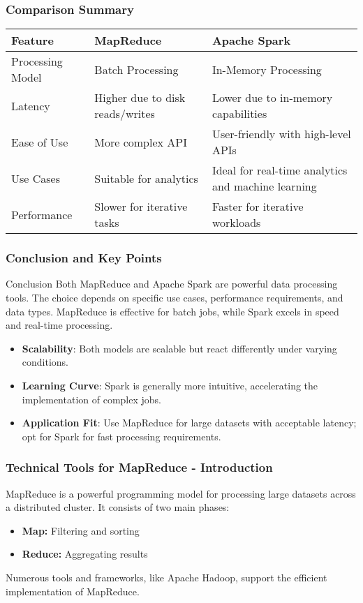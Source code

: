 \documentclass[aspectratio=169]{beamer}
\begin{document}
\begin{frame}[fragile]
    \frametitle{Comparison Summary}
    \begin{center}
        \begin{tabular}{|l|l|l|}
            \hline
            \textbf{Feature} & \textbf{MapReduce} & \textbf{Apache Spark} \\
            \hline
            Processing Model & Batch Processing & In-Memory Processing \\
            \hline
            Latency & Higher due to disk reads/writes & Lower due to in-memory capabilities \\
            \hline
            Ease of Use & More complex API & User-friendly with high-level APIs \\
            \hline
            Use Cases & Suitable for analytics & Ideal for real-time analytics and machine learning \\
            \hline
            Performance & Slower for iterative tasks & Faster for iterative workloads \\
            \hline
        \end{tabular}
    \end{center}
\end{frame}

\begin{frame}[fragile]
    \frametitle{Conclusion and Key Points}
    \begin{block}{Conclusion}
        Both MapReduce and Apache Spark are powerful data processing tools. The choice depends on specific use cases, performance requirements, and data types. MapReduce is effective for batch jobs, while Spark excels in speed and real-time processing.
    \end{block}
    \begin{itemize}
        \item \textbf{Scalability}: Both models are scalable but react differently under varying conditions.
        \item \textbf{Learning Curve}: Spark is generally more intuitive, accelerating the implementation of complex jobs.
        \item \textbf{Application Fit}: Use MapReduce for large datasets with acceptable latency; opt for Spark for fast processing requirements.
    \end{itemize}
\end{frame}

\begin{frame}[fragile]
    \frametitle{Technical Tools for MapReduce - Introduction}
    
    MapReduce is a powerful programming model for processing large datasets across a distributed cluster. It consists of two main phases:
    \begin{itemize}
        \item \textbf{Map:} Filtering and sorting
        \item \textbf{Reduce:} Aggregating results
    \end{itemize}
    
    Numerous tools and frameworks, like Apache Hadoop, support the efficient implementation of MapReduce.
\end{frame}
\end{document}
